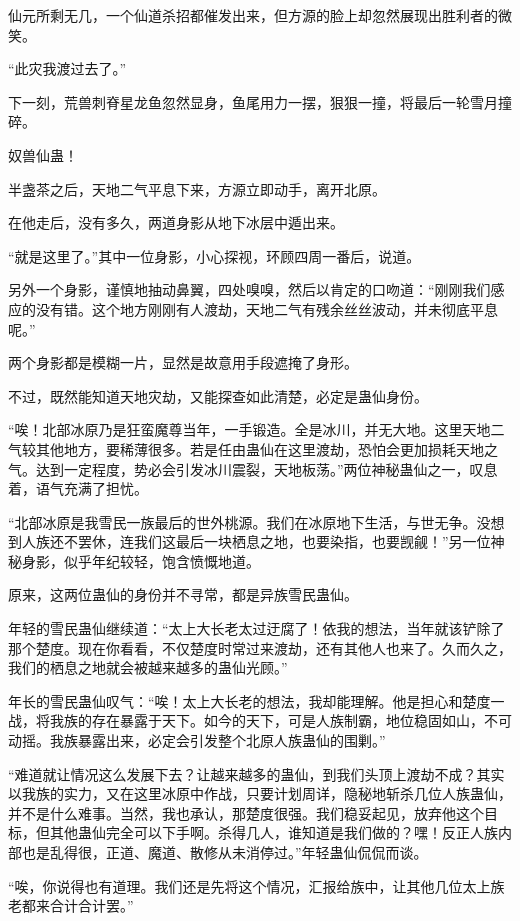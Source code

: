 \begin{this_body}
仙元所剩无几，一个仙道杀招都催发出来，但方源的脸上却忽然展现出胜利者的微笑。

“此灾我渡过去了。”

下一刻，荒兽刺脊星龙鱼忽然显身，鱼尾用力一摆，狠狠一撞，将最后一轮雪月撞碎。

奴兽仙蛊！

半盏茶之后，天地二气平息下来，方源立即动手，离开北原。

在他走后，没有多久，两道身影从地下冰层中遁出来。

“就是这里了。”其中一位身影，小心探视，环顾四周一番后，说道。

另外一个身影，谨慎地抽动鼻翼，四处嗅嗅，然后以肯定的口吻道：“刚刚我们感应的没有错。这个地方刚刚有人渡劫，天地二气有残余丝丝波动，并未彻底平息呢。”

两个身影都是模糊一片，显然是故意用手段遮掩了身形。

不过，既然能知道天地灾劫，又能探查如此清楚，必定是蛊仙身份。

“唉！北部冰原乃是狂蛮魔尊当年，一手锻造。全是冰川，并无大地。这里天地二气较其他地方，要稀薄很多。若是任由蛊仙在这里渡劫，恐怕会更加损耗天地之气。达到一定程度，势必会引发冰川震裂，天地板荡。”两位神秘蛊仙之一，叹息着，语气充满了担忧。

“北部冰原是我雪民一族最后的世外桃源。我们在冰原地下生活，与世无争。没想到人族还不罢休，连我们这最后一块栖息之地，也要染指，也要觊觎！”另一位神秘身影，似乎年纪较轻，饱含愤慨地道。

原来，这两位蛊仙的身份并不寻常，都是异族雪民蛊仙。

年轻的雪民蛊仙继续道：“太上大长老太过迂腐了！依我的想法，当年就该铲除了那个楚度。现在你看看，不仅楚度时常过来渡劫，还有其他人也来了。久而久之，我们的栖息之地就会被越来越多的蛊仙光顾。”

年长的雪民蛊仙叹气：“唉！太上大长老的想法，我却能理解。他是担心和楚度一战，将我族的存在暴露于天下。如今的天下，可是人族制霸，地位稳固如山，不可动摇。我族暴露出来，必定会引发整个北原人族蛊仙的围剿。”

“难道就让情况这么发展下去？让越来越多的蛊仙，到我们头顶上渡劫不成？其实以我族的实力，又在这里冰原中作战，只要计划周详，隐秘地斩杀几位人族蛊仙，并不是什么难事。当然，我也承认，那楚度很强。我们稳妥起见，放弃他这个目标，但其他蛊仙完全可以下手啊。杀得几人，谁知道是我们做的？嘿！反正人族内部也是乱得很，正道、魔道、散修从未消停过。”年轻蛊仙侃侃而谈。

“唉，你说得也有道理。我们还是先将这个情况，汇报给族中，让其他几位太上族老都来合计合计罢。”


\end{this_body}
